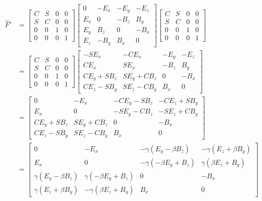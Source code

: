 \begin{align*}
\hat{F}' &=
\begin{bmatrix}
C & S & 0 & 0 \\
S & C & 0 & 0 \\
0 & 0 & 1 & 0 \\
0 & 0 & 0 & 1
\end{bmatrix}
\begin{bmatrix}
0 & -E_x & -E_y & -E_z \\
E_x & 0 & -B_z & B_y \\
E_y & B_z & 0 & -B_x \\
E_z & -B_y & B_x & 0
\end{bmatrix} 
\begin{bmatrix}
C & S & 0 & 0 \\
S & C & 0 & 0 \\
0 & 0 & 1 & 0 \\
0 & 0 & 0 & 1
\end{bmatrix} \\
&=
\begin{bmatrix}
C & S & 0 & 0 \\
S & C & 0 & 0 \\
0 & 0 & 1 & 0 \\
0 & 0 & 0 & 1
\end{bmatrix}
\begin{bmatrix}
- S E_x        & -C E_x        & -E_y  & -E_z \\
C E_x          & S E_x         & -B_z  & B_y \\
C E_y + S B_z  & S E_y + C B_z & 0     & -B_x \\
C E_z - S B_y  & S E_z - C B_y & B_x   & 0 
\end{bmatrix} \\
&=
\begin{bmatrix}
0 & -E_x & -C E_y - S B_z & - C E_z + S B_y \\
E_x & 0 & -S E_y - C B_z & - S E_z + C B_y \\
C E_y + S B_z & S E_y + C B_z & 0 & -B_x \\
C E_z - S B_y & S E_z - C B_y & B_x & 0
\end{bmatrix} \\
&=
\begin{bmatrix}
0 & -E_x & -\gamma(E_y - \beta B_z) & - \gamma(E_z + \beta B_y) \\
E_x & 0 & - \gamma (-\beta E_y + B_z) & \gamma( \beta E_z + B_y) \\
\gamma (E_y - \beta B_z) & \gamma(-\beta E_y + B_z) & 0 & -B_x \\
\gamma (E_z + \beta B_y) & -\gamma(\beta E_z + B_y) & B_x & 0
\end{bmatrix} \\
\end{align*}

